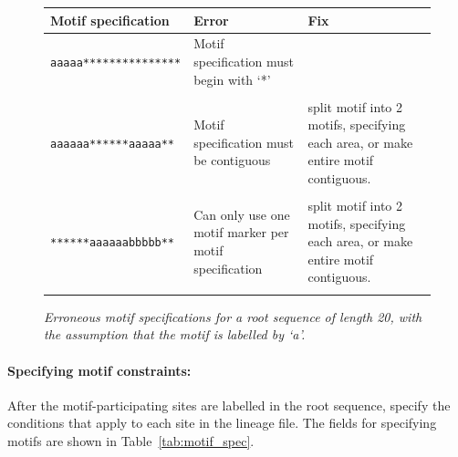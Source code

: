 \documentclass[10pt]{article}
\begin{document}
 \begin{figure}[htbp]
  \begin{tabular}{lp{2.5in}p{2.5in}}
   \hline\hline
   Motif specification & Error & Fix\\
   \hline
   {\tt aaaaa***************} & Motif specification must begin with `*'\\\\
   {\tt *aaaaaa******aaaaa**} & Motif specification must be contiguous & split motif into 2 motifs, specifying each area, or make entire motif contiguous.\\\\
   {\tt *******aaaaaabbbbb**} & Can only use one motif marker per motif specification & split motif into 2 motifs, specifying each area, or make entire motif contiguous.\\\\
   \hline
  \end{tabular}
  \caption{\textit{Erroneous motif specifications for a root sequence of length 20, with the assumption that the motif is labelled by `a'.}}
  \label{fig:motif_errors}
 \end{figure}
 
  \paragraph{Specifying motif constraints:} After the motif-participating sites are labelled in the root sequence, specify the conditions that apply to each site in the lineage file. The fields for specifying motifs are shown in Table~\ref{tab:motif_spec}. 
\end{document}
